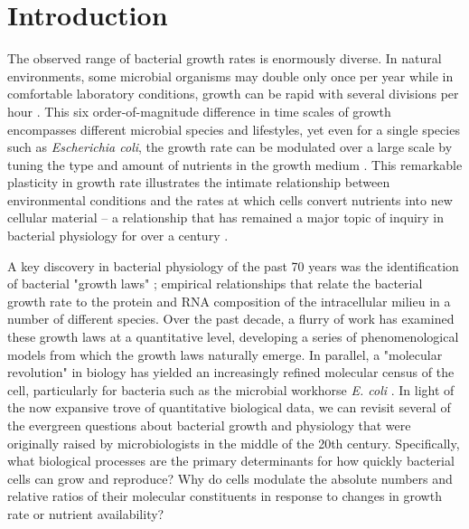 
\section{Introduction}
The observed range of bacterial growth rates is enormously diverse. In natural
environments, some microbial organisms may double only once per year
\citep{mikucki2009} while in comfortable laboratory conditions, growth can be
rapid with several divisions per hour \citep{schaechter1958}. This six
order-of-magnitude difference in time scales of growth encompasses different
microbial species and lifestyles, yet even for a single species such as
\textit{Escherichia coli}, the growth rate can be modulated over a
large scale by tuning the type and amount of nutrients in the growth medium
\citep{liu2005a}. This remarkable plasticity in growth rate illustrates the
intimate relationship between environmental conditions and the rates at which
cells convert nutrients into new cellular material -- a relationship that has
remained a major topic of inquiry in bacterial physiology for over a century
\citep{jun2018}.

A key discovery in bacterial physiology of the past 70 years was the
identification of bacterial "growth laws" \citep{schaechter1958}; empirical
relationships that relate the bacterial growth rate to the protein and RNA
composition of the intracellular milieu in a number of different species.
Over the past decade, a flurry of work \citep{molenaar2009, scott2010,
klumpp2014, basan2015, dai2016, erickson2017} has examined these growth laws
at a quantitative level, developing a series of phenomenological models from
which the growth laws naturally emerge. In parallel, a "molecular revolution"
in biology has yielded an increasingly refined molecular census of the cell,
particularly for bacteria such as the microbial workhorse \textit{E. coli}
\citep{schmidt2016, davidi2016a}. In light of the now expansive trove of
quantitative biological data, we can revisit several of the evergreen
questions about bacterial growth and physiology that were originally raised
by microbiologists in the middle of the 20th century. Specifically, what
biological processes are the primary determinants for how quickly bacterial
cells can grow and reproduce? Why do cells modulate the absolute numbers and
relative ratios of their molecular constituents in response to changes in
growth rate or nutrient availability?

